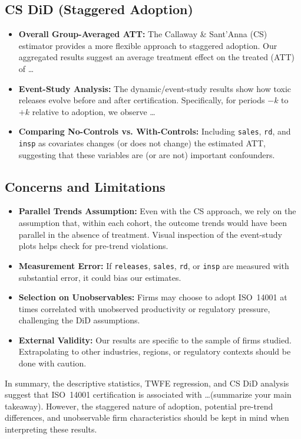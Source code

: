 \documentclass[10pt, oneside]{article}
\begin{document}
\subsection{CS DiD (Staggered Adoption)}

\begin{itemize}
    \item \textbf{Overall Group-Averaged ATT:} 
    The Callaway \& Sant’Anna (CS) estimator provides a more flexible approach to staggered adoption. 
    Our aggregated results suggest an average treatment effect on the treated (ATT) of \dots
    
    \item \textbf{Event-Study Analysis:} 
    The dynamic/event-study results show how toxic releases evolve before and after certification. 
    Specifically, for periods $-k$ to $+k$ relative to adoption, we observe \dots
    
    \item \textbf{Comparing No-Controls vs. With-Controls:} 
    Including \texttt{sales}, \texttt{rd}, and \texttt{insp} as covariates changes (or does not change) 
    the estimated ATT, suggesting that these variables are (or are not) important confounders.
\end{itemize}

\subsection{Concerns and Limitations}

\begin{itemize}
    \item \textbf{Parallel Trends Assumption:} 
    Even with the CS approach, we rely on the assumption that, within each cohort, the outcome trends 
    would have been parallel in the absence of treatment. Visual inspection of the event-study plots 
    helps check for pre-trend violations.
    
    \item \textbf{Measurement Error:} 
    If \texttt{releases}, \texttt{sales}, \texttt{rd}, or \texttt{insp} are measured with substantial error, 
    it could bias our estimates.
    
    \item \textbf{Selection on Unobservables:} 
    Firms may choose to adopt ISO~14001 at times correlated with unobserved productivity or regulatory pressure, 
    challenging the DiD assumptions.
    
    \item \textbf{External Validity:} 
    Our results are specific to the sample of firms studied. Extrapolating to other industries, regions, 
    or regulatory contexts should be done with caution.
\end{itemize}

\noindent
In summary, the descriptive statistics, TWFE regression, and CS DiD analysis suggest that 
ISO~14001 certification is associated with \dots (summarize your main takeaway). 
However, the staggered nature of adoption, potential pre-trend differences, and unobservable 
firm characteristics should be kept in mind when interpreting these results.
\end{document}
